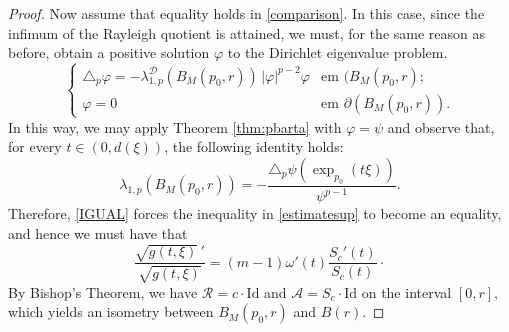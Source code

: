 \documentclass{article}
\begin{document}
\begin{proof}
Now assume that equality holds in \eqref{comparison}. In this case, since the
infimum of the Rayleigh quotient is attained, we must, for the same reason as
before, obtain a positive solution $\varphi$ to the Dirichlet eigenvalue
problem.
\begin{equation}\label{eq:p-eigbola}
\begin{cases}
 \triangle_p \varphi =  - \lambda_{1,p}^{\mathcal{D}}(B_M(p_0,r))\,|\varphi |^{p-2}\varphi 
& \text{em } (B_M(p_0,r);\\
\varphi  =  0 & \text{em } \partial (B_M(p_0,r)).
\end{cases}
\end{equation}
In this way, we may apply Theorem \ref{thm:pbarta} with $\varphi = \psi$ and
observe that, for every $t \in (0, d(\xi))$, the following identity
holds:
\begin{equation}\label{IGUAL}
    \lambda_{1,p}(B_M(p_0,r)) =  - \frac{\triangle_p  \psi(\exp_{p_0}(t \xi))}{ \psi^{p-1}}.
\end{equation}
Therefore, \eqref{IGUAL} forces the inequality in \eqref{estimatesup} to become
an equality, and hence we must have that
\begin{equation*}
   \frac{\sqrt{g(t,\xi)}\,'}{\sqrt{g(t,\xi)}} =(m-1)\omega'(t) \frac{S_c'(t)}{S_c(t)} \cdot
\end{equation*}
By Bishop's Theorem, we have $\mathcal{R} = c \cdot \mathrm{Id}$ and
$\mathcal{A} = S_c \cdot \mathrm{Id}$ on the interval $[0,r]$, which yields an
isometry between $B_M(p_0,r)$ and $B(r)$.


\end{proof}
\end{document}
